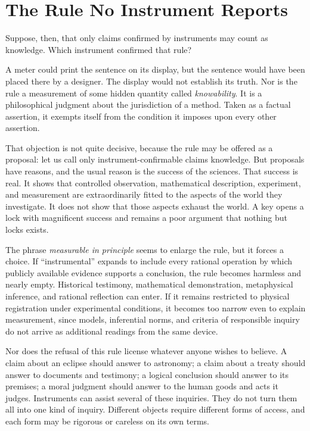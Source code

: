 \section{The Rule No Instrument Reports}

Suppose, then, that only claims confirmed by instruments may count as knowledge. Which instrument confirmed that rule?

A meter could print the sentence on its display, but the sentence would have been placed there by a designer. The display would not establish its truth. Nor is the rule a measurement of some hidden quantity called \emph{knowability}. It is a philosophical judgment about the jurisdiction of a method. Taken as a factual assertion, it exempts itself from the condition it imposes upon every other assertion.

That objection is not quite decisive, because the rule may be offered as a proposal: let us call only instrument-confirmable claims knowledge. But proposals have reasons, and the usual reason is the success of the sciences. That success is real. It shows that controlled observation, mathematical description, experiment, and measurement are extraordinarily fitted to the aspects of the world they investigate. It does not show that those aspects exhaust the world. A key opens a lock with magnificent success and remains a poor argument that nothing but locks exists.

The phrase \emph{measurable in principle} seems to enlarge the rule, but it forces a choice. If ``instrumental'' expands to include every rational operation by which publicly available evidence supports a conclusion, the rule becomes harmless and nearly empty. Historical testimony, mathematical demonstration, metaphysical inference, and rational reflection can enter. If it remains restricted to physical registration under experimental conditions, it becomes too narrow even to explain measurement, since models, inferential norms, and criteria of responsible inquiry do not arrive as additional readings from the same device.

Nor does the refusal of this rule license whatever anyone wishes to believe. A claim about an eclipse should answer to astronomy; a claim about a treaty should answer to documents and testimony; a logical conclusion should answer to its premises; a moral judgment should answer to the human goods and acts it judges. Instruments can assist several of these inquiries. They do not turn them all into one kind of inquiry. Different objects require different forms of access, and each form may be rigorous or careless on its own terms.

